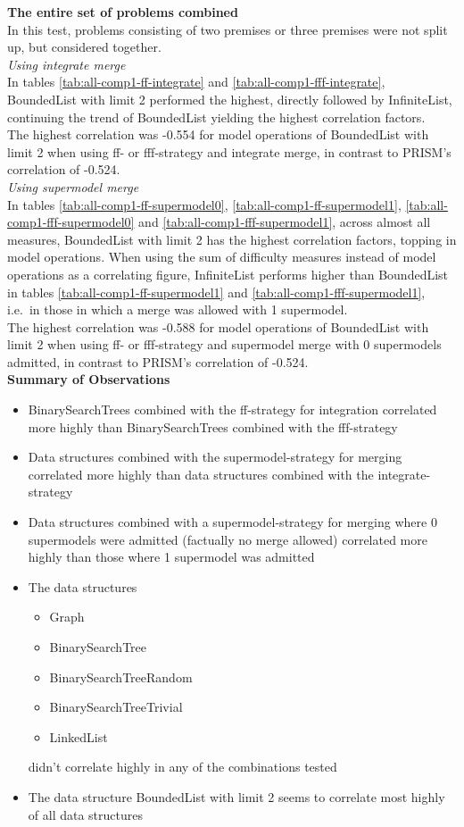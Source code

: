 \documentclass[hidelinks]{scrartcl}
\begin{document}
\textbf{The entire set of problems combined} \\
In this test, problems consisting of two premises or three premises were not split up, but considered together.\\

\textit{Using integrate merge} \\
In tables \ref{tab:all-comp1-ff-integrate} and \ref{tab:all-comp1-fff-integrate}, BoundedList with limit 2 performed the highest, directly followed by InfiniteList, continuing the trend of BoundedList yielding the highest correlation factors. \\
The highest correlation was -0.554 for model operations of BoundedList with limit 2 when using ff- or fff-strategy and integrate merge, in contrast to PRISM's correlation of -0.524. \\

\textit{Using supermodel merge} \\
In tables \ref{tab:all-comp1-ff-supermodel0}, \ref{tab:all-comp1-ff-supermodel1}, \ref{tab:all-comp1-fff-supermodel0} and \ref{tab:all-comp1-fff-supermodel1}, across almost all measures, BoundedList with limit 2 has the highest correlation factors, topping in model operations. When using the sum of difficulty measures instead of model operations as a correlating figure, InfiniteList performs higher than BoundedList in tables \ref{tab:all-comp1-ff-supermodel1} and \ref{tab:all-comp1-fff-supermodel1}, i.e.\ in those in which a merge was allowed with 1 supermodel. \\
The highest correlation was -0.588 for model operations of BoundedList with limit 2 when using ff- or fff-strategy and supermodel merge with 0 supermodels admitted, in contrast to PRISM's correlation of -0.524. \\

\textbf{Summary of Observations}
\begin{itemize}
\item BinarySearchTrees combined with the ff-strategy for integration correlated more highly than BinarySearchTrees combined with the fff-strategy
\item Data structures combined with the supermodel-strategy for merging correlated more highly than data structures combined with the integrate-strategy
\item Data structures combined with a supermodel-strategy for merging where 0 supermodels were admitted (factually no merge allowed) correlated more highly than those where 1 supermodel was admitted
\item The data structures 
	\begin{itemize}
	\item Graph
	\item BinarySearchTree
	\item BinarySearchTreeRandom
	\item BinarySearchTreeTrivial
	\item LinkedList
	\end{itemize}
didn't correlate highly in any of the combinations tested
\item The data structure BoundedList with limit 2 seems to correlate most highly of all data structures
\end{itemize}
\end{document}
